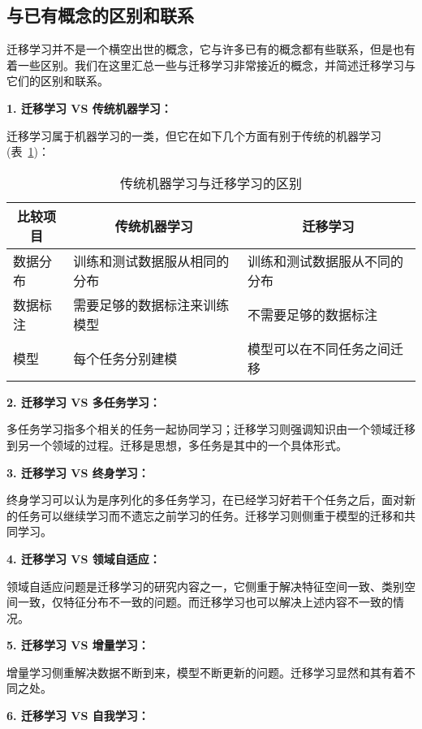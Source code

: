 \subsection{与已有概念的区别和联系}

迁移学习并不是一个横空出世的概念，它与许多已有的概念都有些联系，但是也有着一些区别。我们在这里汇总一些与迁移学习非常接近的概念，并简述迁移学习与它们的区别和联系。

\textbf{1. 迁移学习 VS 传统机器学习：}

迁移学习属于机器学习的一类，但它在如下几个方面有别于传统的机器学习(表~\ref{tb-introduction-machinelearning})：

\begin{table}[htbp]
\centering
\caption{传统机器学习与迁移学习的区别}
\label{tb-introduction-machinelearning}
\begin{tabular}{|l|l|l|}
\hline
\multicolumn{1}{|c|}{\textbf{比较项目}} & \multicolumn{1}{c|}{\textbf{传统机器学习}} & \multicolumn{1}{c|}{\textbf{迁移学习}} \\ \hline
数据分布 & 训练和测试数据服从相同的分布 & 训练和测试数据服从不同的分布 \\ \hline
数据标注 & 需要足够的数据标注来训练模型 & 不需要足够的数据标注 \\ \hline
模型 & 每个任务分别建模 & 模型可以在不同任务之间迁移 \\ \hline
\end{tabular}
\end{table}

\textbf{2. 迁移学习 VS 多任务学习：}

多任务学习指多个相关的任务一起协同学习；迁移学习则强调知识由一个领域迁移到另一个领域的过程。迁移是思想，多任务是其中的一个具体形式。

\textbf{3. 迁移学习 VS 终身学习：}

终身学习可以认为是序列化的多任务学习，在已经学习好若干个任务之后，面对新的任务可以继续学习而不遗忘之前学习的任务。迁移学习则侧重于模型的迁移和共同学习。

\textbf{4. 迁移学习 VS 领域自适应：}

领域自适应问题是迁移学习的研究内容之一，它侧重于解决特征空间一致、类别空间一致，仅特征分布不一致的问题。而迁移学习也可以解决上述内容不一致的情况。

\textbf{5. 迁移学习 VS 增量学习：}

增量学习侧重解决数据不断到来，模型不断更新的问题。迁移学习显然和其有着不同之处。

\textbf{6. 迁移学习 VS 自我学习：}

